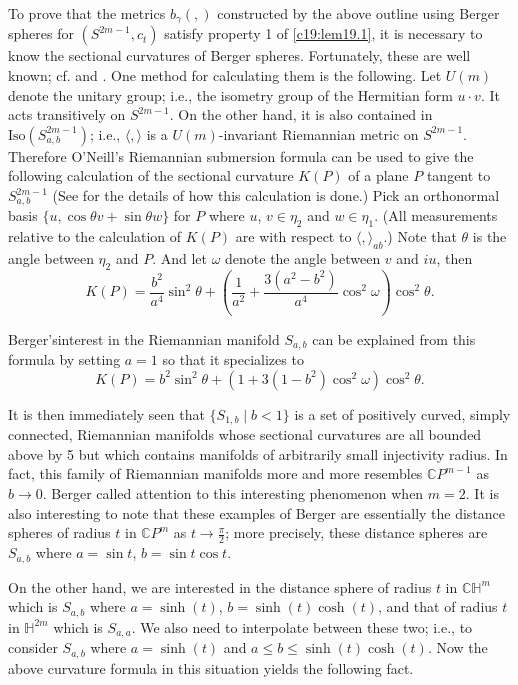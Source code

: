 To prove that the metrics $b_{\gamma}(,)$ constructed by the above
outline using Berger spheres for $(S^{2m-1},c_{t})$ satisfy property 1
of \ref{c19:lem19.1}, it is necessary to know the sectional curvatures
of Berger spheres. Fortunately, these are well known; cf.\@ \cite{11}
and \cite{19}. One method for calculating them is the following. Let
$U(m)$ denote the unitary group; i.e., the isometry group of the
Hermitian form $u\cdot v$. It acts transitively on $S^{2m-1}$. On the
other hand, it is also contained in $\text{Iso}(S^{2m-1}_{a,b})$;
i.e., $\langle,\rangle$ is a $U(m)$-invariant Riemannian metric on
$S^{2m-1}$. Therefore O'Neill's Riemannian submersion formula
\cite{81} can be used to give the following calculation of the
sectional curvature $K(P)$ of a plane $P$ tangent to $S^{2m-1}_{a,b}$
(See \cite[\S 2]{46} for the details of how this calculation is done.)
Pick an orthonormal basis $\{u,\cos\theta v+\sin \theta w\}$ for $P$
where $u$, $v\in\eta_{2}$ and $w\in \eta_{1}$. (All measurements
relative to the calculation of $K(P)$ are with respect to
$\langle,\rangle_{ab}$.) Note that $\theta$ is the angle between
$\eta_{2}$ and $P$. And let $\omega$ denote the angle between $v$ and
$iu$, then
$$
K(P)=\frac{b^{2}}{a^{4}}\sin^{2}\theta+\left(\frac{1}{a^{2}}+\frac{3(a^{2}-b^{2})}{a^{4}}\cos^{2}\omega\right)\cos^{2}\theta. 
$$

Berger's\pageoriginale interest in the Riemannian manifold $S_{a,b}$
can be explained from this formula by setting $a=1$ so that it
specializes to
$$
K(P)=b^{2}\sin^{2}\theta+(1+3(1-b^{2})\cos^{2}\omega)\cos^{2}\theta.
$$

It is then immediately seen that $\{S_{1,b}\mid b<1\}$ is a set of
positively curved, simply connected, Riemannian manifolds whose
sectional curvatures are all bounded above by 5 but which contains
manifolds of arbitrarily small injectivity radius. In fact, this
family of Riemannian manifolds more and more resembles
$\mathbb{C}P^{m-1}$ as $b\to 0$. Berger called attention to this
interesting phenomenon when $m=2$. It is also interesting to note that
these examples of Berger are essentially the distance spheres of
radius $t$ in $\mathbb{C}P^{m}$ as $t\to \frac{\pi}{2}$; more
precisely, these distance spheres are $S_{a,b}$ where $a=\sin t$,
$b=\sin t\cos t$.

On the other hand, we are interested in the distance sphere of radius
$t$ in $\mathbb{CH}^{m}$ which is $S_{a,b}$ where $a=\sinh(t)$,
$b=\sinh(t)\cosh (t)$, and that of radius $t$ in $\mathbb{H}^{2m}$
which is $S_{a,a}$. We also need to interpolate between these two;
i.e., to consider $S_{a,b}$ where $a=\sinh(t)$ and $a\leq b\leq
\sinh(t)\cosh(t)$. Now the above curvature formula in this situation
yields the following fact.


